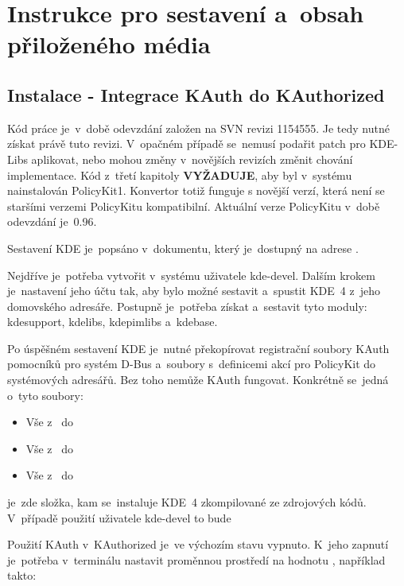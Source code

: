 \chapter{Instrukce pro sestavení a~obsah přiloženého média}
\section*{Instalace - Integrace KAuth do KAuthorized}
Kód práce je~v~době odevzdání založen na SVN revizi 1154555. Je tedy nutné získat právě tuto revizi. V~opačném případě se~nemusí podařit patch pro KDE-Libs aplikovat, nebo mohou změny v~novějších revizích změnit chování implementace. Kód z~třetí kapitoly \textbf{VYŽADUJE}, aby byl v~systému nainstalován PolicyKit1. Konvertor totiž funguje s novější verzí, která není se staršími verzemi PolicyKitu kompatibilní. Aktuální verze PolicyKitu v~době odevzdání je~0.96.

Sestavení KDE je~popsáno v~dokumentu, který je~dostupný na adrese \cite{KDESetup}.

Nejdříve je~potřeba vytvořit v~systému uživatele kde-devel. Dalším krokem je~nastavení jeho účtu tak, aby bylo možné sestavit a~spustit KDE~4 z~jeho domovského adresáře. Postupně je~potřeba získat a~sestavit tyto moduly: kdesupport, kdelibs, kdepimlibs a~kdebase.

Po úspěšném sestavení KDE je~nutné překopírovat registrační soubory KAuth pomocníků pro systém D-Bus a~soubory s~definicemi akcí pro PolicyKit do systémových adresářů. Bez toho nemůže KAuth fungovat. Konkrétně se~jedná o~tyto soubory:
\begin{itemize}
\item Vše z~ do 
\item Vše z~ do 
\item Vše z~ do 
\end{itemize}

\noindent
{} je~zde složka, kam se~instaluje KDE~4 zkompilované ze zdrojových kódů. V~případě použití uživatele kde-devel to bude 

Použití KAuth v~KAuthorized je~ve výchozím stavu vypnuto. K~jeho zapnutí je~potřeba v~terminálu nastavit proměnnou prostředí  na hodnotu , například takto:


